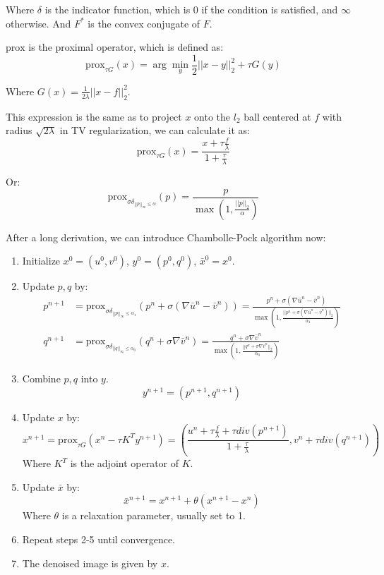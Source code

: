 \documentclass[12pt]{ctexart}
\begin{document}
Where $\delta$ is the indicator function, which is 0 if the condition is satisfied,
and $\infty$ otherwise. And $F^*$ is the convex conjugate of $F$.

$\text{prox}$ is the proximal operator, which is defined as:
\[
  \text{prox}_{\tau G}(x) = \arg\min_y \frac{1}{2} ||x - y||_2^2 + \tau G(y)
\]

Where $G(x) = \frac{1}{2\lambda} ||x - f||_2^2$. 

This expression is the same as to project $x$ onto the $l_2$ ball centered at $f$
with radius $\sqrt{2\lambda}$ in TV regularization, we can calculate it as:
\[
  \text{prox}_{\tau G}(x) = \frac{x + \tau \frac{f}{\lambda}}{1 + \frac{\tau}{\lambda}}
\]

Or:
\[
  \text{prox}_{\sigma \delta_{||p||_\infty \leq \alpha}}(p) = \frac{p}{\max(1,
  \frac{||p||_2}{\alpha})}
\]

\vspace{1em}

After a long derivation, we can introduce Chambolle-Pock algorithm now:
\begin{enumerate}
  \item Initialize $x^0 = (u^0, v^0)$, $y^0 = (p^0, q^0)$, $\bar{x}^0 = x^0$.
  \item Update $p, q$ by:
  \begin{align*}
    p^{n+1} &= \text{prox}_{\sigma \delta_{||p||_\infty \leq \alpha_1}}(p^n + \sigma
    (\nabla \bar{u}^n - \bar{v}^n)) = \frac{p^n + \sigma (\nabla \bar{u}^n -
    \bar{v}^n)}{\max(1, \frac{||p^n + \sigma (\nabla \bar{u}^n - \bar{v}^n)||_2}{\alpha_1})}
  \\
    q^{n+1} &= \text{prox}_{\sigma \delta_{||q||_\infty \leq \alpha_0}}(q^n + \sigma \nabla
    \bar{v}^n) = \frac{q^n + \sigma \nabla \bar{v}^n}{\max(1, \frac{||q^n + \sigma \nabla
    \bar{v}^n||_2}{\alpha_0})}
  \end{align*}
  \item Combine $p, q$ into $y$.
  \[
    y^{n+1} = (p^{n+1}, q^{n+1})
  \]
  \item Update $x$ by:
  \[
    x^{n+1} = \text{prox}_{\tau G}(x^n - \tau K^T y^{n+1}) = \left(
    \frac{u^n + \tau \frac{f}{\lambda} + \tau div(p^{n+1})}{1 + \frac{\tau}{\lambda}},
    v^n + \tau div(q^{n+1}) \right)
  \]
  Where $K^T$ is the adjoint operator of $K$.
  \item Update $\bar{x}$ by:
  \[
    \bar{x}^{n+1} = x^{n+1} + \theta (x^{n+1} - x^n)
  \]
  Where $\theta$ is a relaxation parameter, usually set to 1.
  \item Repeat steps 2-5 until convergence.
  \item The denoised image is given by $x$.
\end{enumerate}
\end{document}
